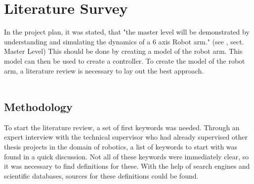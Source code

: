 \chapter{Literature Survey}

In the project plan, it was stated, that "the master level will be demonstrated by understanding and simulating the dynamics of a 6 axis Robot arm." (see \cite{ProjectPlan}, sect. Master Level)
This should be done by creating a model of the robot arm. This model can then be used to create a controller.
To create the model of the robot arm, a literature review is necessary to lay out the best approach.\\
\\ 



\section{Methodology}

To start the literature review, a set of first keywords was needed. Through an expert interview with the technical supervisor %
\cite{Trung}
who had already supervised other thesis projects in the domain of robotics, a list of keywords to start with was found in a quick discussion. 
Not all of these keywords were immediately clear, so it was necessary to find definitions for these. 
With the help of search engines and scientific databases, sources for these definitions could be found.\\

